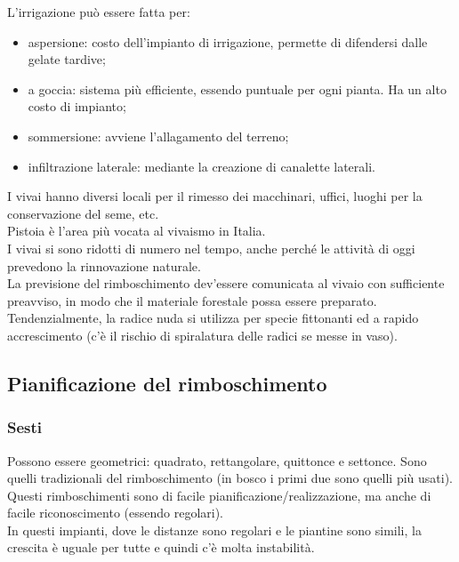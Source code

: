 L'irrigazione può essere fatta per:
\begin{itemize}[nosep]
    \item aspersione: costo dell'impianto di irrigazione, permette di difendersi dalle gelate tardive;
    \item a goccia: sistema più efficiente, essendo puntuale per ogni pianta. Ha un alto costo di impianto;
    \item sommersione: avviene l'allagamento del terreno;
    \item infiltrazione laterale: mediante la creazione di canalette laterali. 
\end{itemize}
I vivai hanno diversi locali per il rimesso dei macchinari, uffici, luoghi per la conservazione del seme, etc.\\
Pistoia è l'area più vocata al vivaismo in Italia.\\
I vivai si sono ridotti di numero nel tempo, anche perché le attività di oggi prevedono la rinnovazione naturale.\\
La previsione del rimboschimento dev'essere comunicata al vivaio con sufficiente preavviso, in modo che il materiale forestale possa essere preparato.\\
Tendenzialmente, la radice nuda si utilizza per specie fittonanti ed a rapido accrescimento (c'è il rischio di spiralatura delle radici se messe in vaso).
\subsection{Pianificazione del rimboschimento}
\subsubsection{Sesti}
Possono essere geometrici: quadrato, rettangolare, quittonce e settonce. Sono quelli tradizionali del rimboschimento (in bosco i primi due sono quelli più usati).\\
Questi rimboschimenti sono di facile pianificazione/realizzazione, ma anche di facile riconoscimento (essendo regolari).\\
In questi impianti, dove le distanze sono regolari e le piantine sono simili, la crescita è uguale per tutte e quindi c'è molta instabilità.
